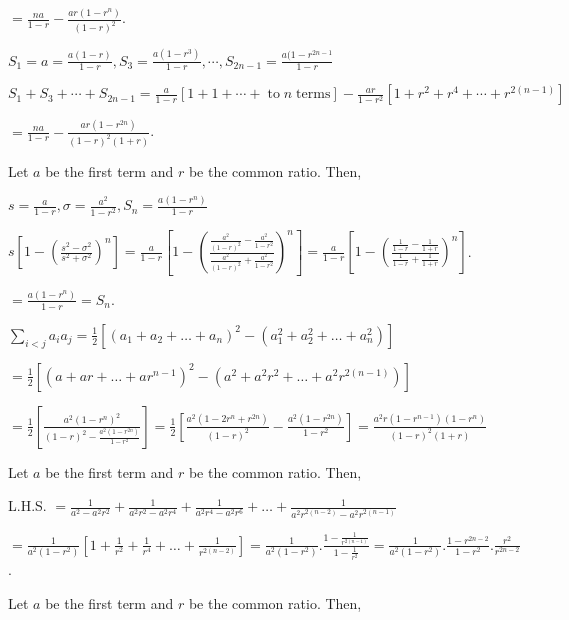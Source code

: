   $= \frac{na}{1 - r} - \frac{ar(1 - r^n)}{(1 - r)^2}$.
\item $S_1 = a = \frac{a(1 - r)}{1 - r}, S_3 = \frac{a(1 - r^3)}{1 - r}, \cdots, S_{2n - 1} =
  \frac{a(1 - r^{2n - 1}}{1 - r}$

  $S_1 + S_3 + \cdots + S_{2n - 1} = \frac{a}{1 - r}[1 + 1 + \cdots +\;\mathrm{to}\;n\;\mathrm{terms}] -
  \frac{ar}{1 - r^2}[1 + r^2 + r^4 + \cdots + r^{2(n -1 )}]$

  $= \frac{na}{1 - r} - \frac{ar(1 - r^{2n})}{(1 - r)^2(1 + r)}$.
\item Let $a$ be the first term and $r$ be the common ratio. Then,

  $s = \frac{a}{1 - r}, \sigma = \frac{a^2}{1 - r^2}, S_n = \frac{a(1 - r^n)}{1 - r}$

  $s\left[1 - \left(\frac{s^2 - \sigma^2}{s^2 + \sigma^2}\right)^n\right] = \frac{a}{1 - r}\left[1 -
  \left(\frac{\tfrac{a^2}{(1 - r)^2} - \tfrac{a^2}{1 - r^2}}{\tfrac{a^2}{(1 - r)^2} + \tfrac{a^2}{1 -
      r^2}}\right)^n\right] = \frac{a}{1 - r}\left[1 - \left(\frac{\tfrac{1}{1 - r} - \tfrac{1}{1 +
      r}}{\tfrac{1}{1 - r} + \tfrac{1}{1 + r}}\right)^n \right]$.

  $= \frac{a(1 - r^n)}{1 - r} = S_n$.
\item $\sum_{i < j}a_ia_j = \frac{1}{2}[(a_1 + a_2 + \ldots + a_n)^2 - (a_1^2 + a_2^2 + \ldots + a_n^2)]$

  $= \frac{1}{2}\left[(a + ar + \ldots + ar^{n - 1})^2 - (a^2 + a^2r^2 + \ldots + a^2r^{2(n - 1)})\right]$

  $= \frac{1}{2}\left[\frac{a^2(1 - r^n)^2}{(1 - r)^2 - \frac{a^2(1 - r^{2n})}{1 - r^2}}\right] =
  \frac{1}{2}\left[\frac{a^2(1 - 2r^n + r^{2n})}{(1 - r)^2} - \frac{a^2(1 - r^{2n})}{1 - r^2}\right] =
  \frac{a^2r(1 - r^{n - 1})(1 - r^n)}{(1 - r)^2(1 + r)}$
\item Let $a$ be the first term and $r$ be the common ratio. Then,

  L.H.S. $= \frac{1}{a^2 - a^2r^2} + \frac{1}{a^2r^2 - a^2r^4} + \frac{1}{a^2r^4 - a^2r^6} + \ldots +
  \frac{1}{a^2r^{2(n - 2)} - a^2r^{2(n - 1)}}$

  $= \frac{1}{a^2(1 - r^2)}\left[1 + \frac{1}{r^2} + \frac{1}{r^4} + \ldots + \frac{1}{r^{2(n - 2)}}\right]
  = \frac{1}{a^2(1 - r^2)}.\frac{1 - \frac{1}{r^{2(n - 1)}}}{1 - \frac{1}{r^2}} = \frac{1}{a^2(1 -
    r^2)}.\frac{1 - r^{2n - 2}}{1 - r^2}.\frac{r^2}{r^{2n - 2}}$.
\item Let $a$ be the first term and $r$ be the common ratio. Then,


